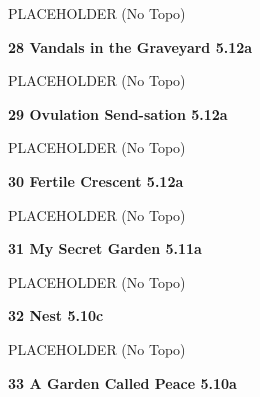 \begin{multicols}{2}
			\begin{adjustwidth}{0.5cm}{}			
			PLACEHOLDER (No Topo)
			\end{adjustwidth}
			
			
			
			\needspace{1.5cm}
\label{rt:Vandals in the Graveyard}
\colorbox{Goldenrod!50}{
\parbox{0.95\linewidth}{
\textbf{
28 Vandals in the Graveyard 5.12a  
}}}

			\begin{adjustwidth}{0.5cm}{}			
			PLACEHOLDER (No Topo)
			\end{adjustwidth}
			
			
			
			\needspace{1.5cm}
\label{rt:Ovulation Send-sation}
\colorbox{Goldenrod!50}{
\parbox{0.95\linewidth}{
\textbf{
29 Ovulation Send-sation 5.12a  
}}}

			\begin{adjustwidth}{0.5cm}{}			
			PLACEHOLDER (No Topo)
			\end{adjustwidth}
			
			
			
			\needspace{1.5cm}
\label{rt:Fertile Crescent}
\colorbox{Goldenrod!50}{
\parbox{0.95\linewidth}{
\textbf{
30 Fertile Crescent 5.12a  
}}}

			\begin{adjustwidth}{0.5cm}{}			
			PLACEHOLDER (No Topo)
			\end{adjustwidth}
			
			
			
			\needspace{1.5cm}
\label{rt:My Secret Garden}
\colorbox{RoyalBlue!20}{
\parbox{0.95\linewidth}{
\textbf{
31 My Secret Garden 5.11a  
}}}

			\begin{adjustwidth}{0.5cm}{}			
			PLACEHOLDER (No Topo)
			\end{adjustwidth}
			
			
			
			\needspace{1.5cm}
\label{rt:Nest}
\colorbox{RoyalBlue!20}{
\parbox{0.95\linewidth}{
\textbf{
32 Nest 5.10c  
}}}

			\begin{adjustwidth}{0.5cm}{}			
			PLACEHOLDER (No Topo)
			\end{adjustwidth}
			
			
			
			\needspace{1.5cm}
\label{rt:A Garden Called Peace}
\colorbox{RoyalBlue!20}{
\parbox{0.95\linewidth}{
\textbf{
33 A Garden Called Peace 5.10a  
}}}


\end{multicols}
